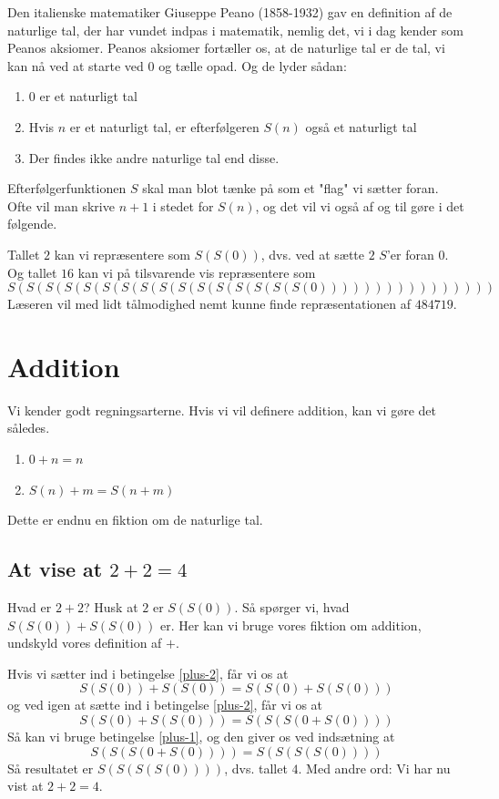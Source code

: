Den italienske matematiker Giuseppe Peano (1858-1932) gav en definition af de naturlige tal, der har vundet indpas i matematik, nemlig det, vi i dag kender som Peanos aksiomer. Peanos aksiomer fortæller os, at de naturlige tal er de tal, vi kan nå ved at starte ved $0$ og tælle opad. Og de lyder sådan:

\begin{enumerate}
    \item $0$ er et naturligt tal
    \item Hvis $n$ er et naturligt tal, er efterfølgeren $S(n)$ også et naturligt tal
    \item Der findes ikke andre naturlige tal end disse.
\end{enumerate}

Efterfølgerfunktionen $S$ skal man blot tænke på som et "flag" vi sætter foran. Ofte vil man skrive $n+1$ i stedet for $S(n)$, og det vil vi også af og til gøre i det følgende.

Tallet $2$ kan vi repræsentere som $S(S(0))$, dvs. ved at sætte $2$ $S$'er foran $0$. Og tallet $16$ kan vi på tilsvarende vis repræsentere som
%
\[ S(S(S(S(S(S(S(S(S(S(S(S(S(S(S(S(0))))))))))))))))\]
%
Læseren vil med lidt tålmodighed nemt kunne finde repræsentationen af $484719$.

\section{Addition}

Vi kender godt regningsarterne. Hvis vi vil definere addition, kan vi gøre det således.

\begin{enumerate}
    \item \label{plus-1} $0 + n = n$
    \item \label{plus-2} $S(n) + m = S(n+m)$
\end{enumerate}

Dette er endnu en fiktion om de naturlige tal.

\subsection{At vise at $2+2 = 4$}

Hvad er $2+2$? Husk at $2$ er $S(S(0))$. Så spørger vi, hvad $S(S(0)) + S(S(0))$ er. Her kan vi bruge vores fiktion om addition, undskyld vores definition af $+$.

Hvis vi sætter ind i betingelse \ref{plus-2}, får vi os at 
%
\[ S(S(0)) + S(S(0)) = S(S(0) + S(S(0)))  \]
%
og ved igen at sætte ind i betingelse \ref{plus-2}, får vi os at 
%
\[  S(S(0) + S(S(0))) = S(S(S(0 + S(0)))) \]
%
Så kan vi bruge betingelse \ref{plus-1}, og den giver os ved indsætning at
%
\[ S(S(S(0 + S(0)))) = S(S(S(S(0)))) \]
%
Så resultatet er $S(S(S(S(0))))$, dvs. tallet $4$. Med andre ord: Vi har nu vist at $2+2 = 4$.

